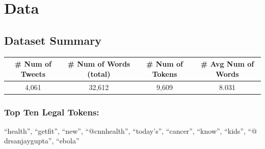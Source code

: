 \documentclass[fleqn]{article}
\begin{document}
\section{Data}
\subsection{Dataset Summary}
\begin{tabular}{|c|c|c|c|}
	\hline
	\textbf{\# Num of Tweets} & \textbf{\# Num of Words (total)} & \textbf{\# Num of Tokens} & \textbf{\# Avg Num of Words}\\
	\hline
	4,061&32,612&9,609&8.031\\
	\hline
\end{tabular}
\subsubsection*{Top Ten Legal Tokens:}
``health'', ``getfit'', ``new'', ``$@$cnnhealth'', ``today's'', ``cancer'', ``know'', ``kids'', ``$@$drsanjaygupta'', ``ebola''
\end{document}
